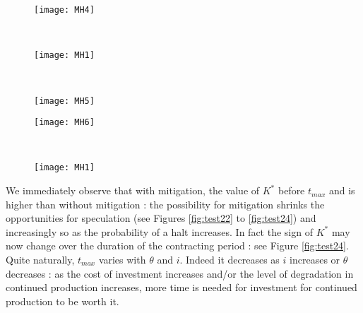 \documentclass[numbook, envcountsect, envcountsame, envcountreset, runningheads, smallextended]{article}
\begin{document}
\begin{figure}[htb!]
\centering
\begin{minipage}{0.31\textwidth}
  \centering
  \texttt{[image: MH4]}
  \label{fig:test25}
\end{minipage}%
~
~
\begin{minipage}{0.31\textwidth}
  \centering
  \texttt{[image: MH1]}
  \label{fig:test26}
\end{minipage}%
~
~
\begin{minipage}{0.31\textwidth}
  \centering
  \texttt{[image: MH5]}
  \label{fig:test27}
\end{minipage}
\end{figure}


\begin{figure}[htb!]
\centering
\begin{minipage}{0.31\textwidth}
  \centering
  \texttt{[image: MH6]}
  \label{fig:test28}
\end{minipage}%
~
~
\begin{minipage}{0.31\textwidth}
  \centering
  \texttt{[image: MH1]}
  \label{fig:test29}
\end{minipage}%
\end{figure}

We immediately observe that with mitigation, the value of $K^*$ before $t_{max}$ and is higher than without mitigation : the possibility for mitigation shrinks the opportunities for speculation  (see Figures \ref{fig:test22} to \ref{fig:test24}) and increasingly so as the probability of a halt increases. In fact the sign of $K^*$ may now change over the duration of the contracting period : see  Figure \ref{fig:test24}. Quite naturally, $t_{max}$ varies with $\theta$ and $i$. Indeed it decreases as $i$ increases or $\theta$ decreases : as the cost of investment increases and/or the level of degradation in continued production increases, more time is needed for investment for continued production to be worth it. \\



\newpage
\end{document}
